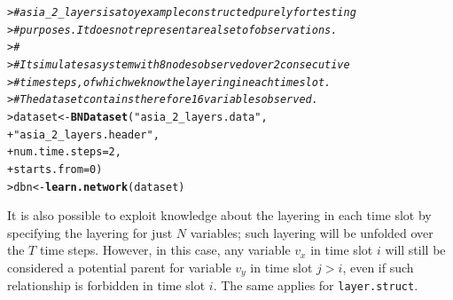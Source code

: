 \documentclass{article}\usepackage[]{graphicx}\usepackage[]{color}
\makeatletter
\newcommand{\hlnum}[1]{\textcolor[rgb]{0.686,0.059,0.569}{#1}}%
\newcommand{\hlstr}[1]{\textcolor[rgb]{0.192,0.494,0.8}{#1}}%
\newcommand{\hlcom}[1]{\textcolor[rgb]{0.678,0.584,0.686}{\textit{#1}}}%
\newcommand{\hlstd}[1]{\textcolor[rgb]{0.345,0.345,0.345}{#1}}%
\newcommand{\hlkwb}[1]{\textcolor[rgb]{0.69,0.353,0.396}{#1}}%
\newcommand{\hlkwc}[1]{\textcolor[rgb]{0.333,0.667,0.333}{#1}}%
\newcommand{\hlkwd}[1]{\textcolor[rgb]{0.737,0.353,0.396}{\textbf{#1}}}%
\newenvironment{kframe}{%
 \def\at@end@of@kframe{}%
 \ifinner\ifhmode%
  \def\at@end@of@kframe{\end{minipage}}%
  \begin{minipage}{\columnwidth}%
 \fi\fi%
 \def\FrameCommand##1{\hskip\@totalleftmargin \hskip-\fboxsep
 \colorbox{shadecolor}{##1}\hskip-\fboxsep
     \hskip-\linewidth \hskip-\@totalleftmargin \hskip\columnwidth}%
 \MakeFramed {\advance\hsize-\width
   \@totalleftmargin\z@ \linewidth\hsize
   \@setminipage}}%
 {\par\unskip\endMakeFramed%
 \at@end@of@kframe}
\newenvironment{knitrout}{}{} %
\newcommand{\Rfunarg}[1]{{\texttt{#1}}}
\makeatother
\begin{document}
\begin{knitrout}
\color{fgcolor}\begin{kframe}
\begin{alltt}
\hlstd{> }\hlcom{# asia_2_layers is a toy example constructed purely for testing}
\hlstd{> }\hlcom{# purposes. It does not represent a real set of observations.}
\hlstd{> }\hlcom{#}
\hlstd{> }\hlcom{# It simulates a system with 8 nodes observed over 2 consecutive}
\hlstd{> }\hlcom{# time steps, of which we know the layering in each time slot.}
\hlstd{> }\hlcom{# The dataset contains therefore 16 variables observed.}
\hlstd{> }\hlstd{dataset} \hlkwb{<-} \hlkwd{BNDataset}\hlstd{(}\hlstr{"asia_2_layers.data"}\hlstd{,}
\hlstd{+ }                     \hlstr{"asia_2_layers.header"}\hlstd{,}
\hlstd{+ }                     \hlkwc{num.time.steps} \hlstd{=} \hlnum{2}\hlstd{,}
\hlstd{+ }                     \hlkwc{starts.from} \hlstd{=} \hlnum{0}\hlstd{)}
\hlstd{> }\hlstd{dbn} \hlkwb{<-} \hlkwd{learn.network}\hlstd{(dataset)}
\end{alltt}
\end{kframe}
\end{knitrout}

It is also possible to exploit knowledge about the layering in each time slot
by specifying the layering for just $N$ variables; such layering will be unfolded over the $T$ time steps.
However, in this case, any variable $v_x$ in time slot $i$ will still be considered a potential parent for variable
$v_y$ in time slot $j>i$, even if such relationship is forbidden in time slot $i$.
The same applies for \Rfunarg{layer.struct}.
\end{document}
